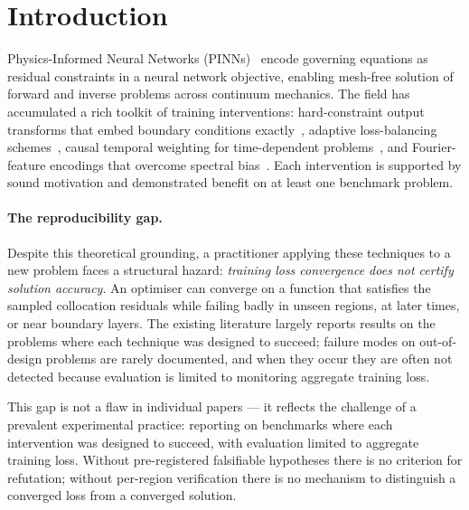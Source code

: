 \documentclass{article}
\begin{document}
\section{Introduction}
\label{sec:intro}

Physics-Informed Neural Networks (PINNs)~\citep{raissi2019} encode governing
equations as residual constraints in a neural network objective, enabling
mesh-free solution of forward and inverse problems across continuum mechanics.
The field has accumulated a rich toolkit of training interventions:
hard-constraint output transforms that embed boundary conditions
exactly~\citep{lagaris1998}, adaptive loss-balancing
schemes~\citep{wang2021gradpath,bischof2021relobralo}, causal temporal
weighting for time-dependent problems~\citep{wang2022causal}, and
Fourier-feature encodings that overcome spectral
bias~\citep{tancik2020ff,wang2021ntk}.
Each intervention is supported by sound motivation and demonstrated benefit
on at least one benchmark problem.

\paragraph{The reproducibility gap.}
Despite this theoretical grounding, a practitioner applying these techniques
to a new problem faces a structural hazard: \emph{training loss convergence
does not certify solution accuracy}.
An optimiser can converge on a function that satisfies the sampled collocation
residuals while failing badly in unseen regions, at later times, or near
boundary layers.
The existing literature largely reports results on the problems where each
technique was designed to succeed; failure modes on out-of-design problems
are rarely documented, and when they occur they are often not detected because
evaluation is limited to monitoring aggregate training loss.

This gap is not a flaw in individual papers — it reflects the challenge of
a prevalent experimental practice: reporting on benchmarks where each
intervention was designed to succeed, with evaluation limited to aggregate
training loss.
Without pre-registered falsifiable hypotheses there is no criterion for
refutation; without per-region verification there is no mechanism to
distinguish a converged loss from a converged solution.
\end{document}
